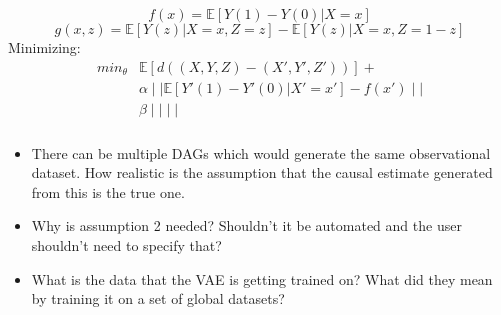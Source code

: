 \documentclass{beamer}
\begin{document}
\begin{frame}
	\frametitle{}
	$$ f(x) = \mathbb{E}[Y(1) - Y(0)| X=x] $$
	$$ g(x, z) = \mathbb{E}[Y(z) | X=x, Z=z] - \mathbb{E}[Y(z) | X=x, Z=1-z ] $$
	Minimizing:
\begin{equation}
	\begin{split}
	\textit{min}_{\theta} & \mathbb{E}[d((X, Y, Z) - (X', Y', Z'))] + \\
			& \alpha \mid\mid \mathbb{E}[Y'(1) - Y'(0) | X'=x'] - f(x') \mid\mid \\
			& \beta \mid\mid \mid\mid
\end{split}
\end{equation}
\end{frame}

\begin{frame}
	\frametitle{}
	\begin{itemize}
		\item There can be multiple DAGs which would generate the same observational dataset. How realistic is the assumption that the causal estimate generated from this is the true one.
		\item Why is assumption 2 needed? Shouldn't it be automated and the user shouldn't need to specify that?
		\item What is the data that the VAE is getting trained on? What did they mean by training it on a set of global datasets?
	\end{itemize}
\end{frame}
\end{document}
